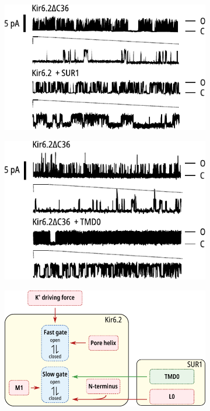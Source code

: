 \begin{figure}[h]
	\centering
	\begin{subfigure}[t]{0.45\textwidth}
		\caption{}\label{ch1fig:singles_sur}
		\centering
		\includegraphics[width=\textwidth]{single_traces_sur.pdf}
	\end{subfigure}
	\hfill
	\begin{subfigure}[t]{0.45\textwidth}
		\caption{}\label{ch1fig:singles_tmd0}
		\centering
		\includegraphics[width=\textwidth]{single_traces_tmd0.pdf}
	\end{subfigure}
	\vfill
	\begin{subfigure}[t]{0.45\textwidth}
		\caption{}\label{ch1fig:intrinsic_diagram}
		\centering
		\includegraphics[width=\textwidth]{regulation_diagram_2.pdf}

\end{subfigure}
\end{figure}
